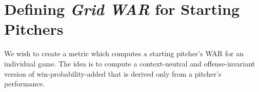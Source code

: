 \documentclass[12pt]{article}
\begin{document}





\section{Defining \textit{Grid WAR} for Starting Pitchers}

We wish to create a metric which computes a starting pitcher's WAR for an individual game. The idea is to compute a context-neutral and offense-invariant version of win-probability-added that is derived only from a pitcher's performance. 
\end{document}
